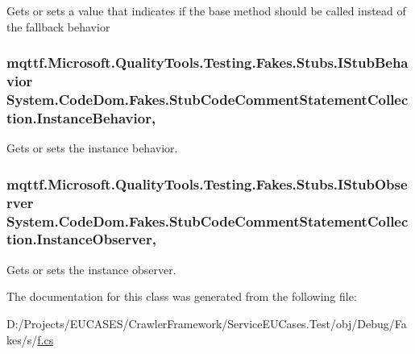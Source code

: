 Gets or sets a value that indicates if the base method should be called instead of the fallback behavior

\hypertarget{class_system_1_1_code_dom_1_1_fakes_1_1_stub_code_comment_statement_collection_a3c4c4ed6fa7282d1620edd6f310224e7}{
\subsubsection[{Instance\-Behavior}]{\setlength{\rightskip}{0pt plus 5cm}mqttf.\-Microsoft.\-Quality\-Tools.\-Testing.\-Fakes.\-Stubs.\-I\-Stub\-Behavior System.\-Code\-Dom.\-Fakes.\-Stub\-Code\-Comment\-Statement\-Collection.\-Instance\-Behavior\hspace{0.3cm}{\ttfamily [get]}, {\ttfamily [set]}}}\label{class_system_1_1_code_dom_1_1_fakes_1_1_stub_code_comment_statement_collection_a3c4c4ed6fa7282d1620edd6f310224e7}


Gets or sets the instance behavior.

\hypertarget{class_system_1_1_code_dom_1_1_fakes_1_1_stub_code_comment_statement_collection_a9c551e8e04b9d87ae2aa4260891ebabc}{
\subsubsection[{Instance\-Observer}]{\setlength{\rightskip}{0pt plus 5cm}mqttf.\-Microsoft.\-Quality\-Tools.\-Testing.\-Fakes.\-Stubs.\-I\-Stub\-Observer System.\-Code\-Dom.\-Fakes.\-Stub\-Code\-Comment\-Statement\-Collection.\-Instance\-Observer\hspace{0.3cm}{\ttfamily [get]}, {\ttfamily [set]}}}\label{class_system_1_1_code_dom_1_1_fakes_1_1_stub_code_comment_statement_collection_a9c551e8e04b9d87ae2aa4260891ebabc}


Gets or sets the instance observer.



The documentation for this class was generated from the following file\-:\begin{DoxyCompactItemize}
\item 
D\-:/\-Projects/\-E\-U\-C\-A\-S\-E\-S/\-Crawler\-Framework/\-Service\-E\-U\-Cases.\-Test/obj/\-Debug/\-Fakes/s/\hyperlink{s_2f_8cs}{f.\-cs}\end{DoxyCompactItemize}
